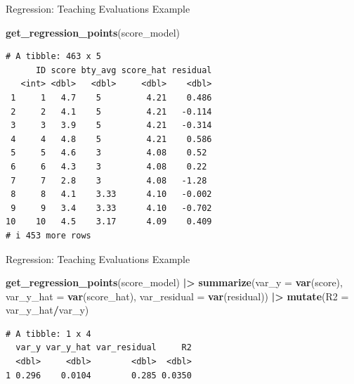 \documentclass[
  ignorenonframetext,
]{beamer}
\newenvironment{Shaded}{\begin{snugshade}}{\end{snugshade}}
\newcommand{\AttributeTok}[1]{\textcolor[rgb]{0.13,0.29,0.53}{#1}}
\newcommand{\FunctionTok}[1]{\textcolor[rgb]{0.13,0.29,0.53}{\textbf{#1}}}
\newcommand{\NormalTok}[1]{#1}
\newcommand{\SpecialCharTok}[1]{\textcolor[rgb]{0.81,0.36,0.00}{\textbf{#1}}}
\begin{document}
\begin{frame}[fragile]{Regression: Teaching Evaluations Example}
\protect{}\label{regression-teaching-evaluations-example-15}
\normalsize

\begin{Shaded}
\begin{Highlighting}[]
\FunctionTok{get\_regression\_points}\NormalTok{(score\_model) }
\end{Highlighting}
\end{Shaded}

\begin{verbatim}
# A tibble: 463 x 5
      ID score bty_avg score_hat residual
   <int> <dbl>   <dbl>     <dbl>    <dbl>
 1     1   4.7    5         4.21    0.486
 2     2   4.1    5         4.21   -0.114
 3     3   3.9    5         4.21   -0.314
 4     4   4.8    5         4.21    0.586
 5     5   4.6    3         4.08    0.52 
 6     6   4.3    3         4.08    0.22 
 7     7   2.8    3         4.08   -1.28 
 8     8   4.1    3.33      4.10   -0.002
 9     9   3.4    3.33      4.10   -0.702
10    10   4.5    3.17      4.09    0.409
# i 453 more rows
\end{verbatim}
\end{frame}

\begin{frame}[fragile]{Regression: Teaching Evaluations Example}
\protect{}\label{regression-teaching-evaluations-example-16}
\small

\begin{Shaded}
\begin{Highlighting}[]
\FunctionTok{get\_regression\_points}\NormalTok{(score\_model) }\SpecialCharTok{|\textgreater{}} 
  \FunctionTok{summarize}\NormalTok{(}\AttributeTok{var\_y =} \FunctionTok{var}\NormalTok{(score), }
            \AttributeTok{var\_y\_hat =} \FunctionTok{var}\NormalTok{(score\_hat), }
            \AttributeTok{var\_residual =} \FunctionTok{var}\NormalTok{(residual)) }\SpecialCharTok{|\textgreater{}} 
  \FunctionTok{mutate}\NormalTok{(}\AttributeTok{R2 =}\NormalTok{ var\_y\_hat}\SpecialCharTok{/}\NormalTok{var\_y)}
\end{Highlighting}
\end{Shaded}

\begin{verbatim}
# A tibble: 1 x 4
  var_y var_y_hat var_residual     R2
  <dbl>     <dbl>        <dbl>  <dbl>
1 0.296    0.0104        0.285 0.0350
\end{verbatim}
\end{frame}
\end{document}
